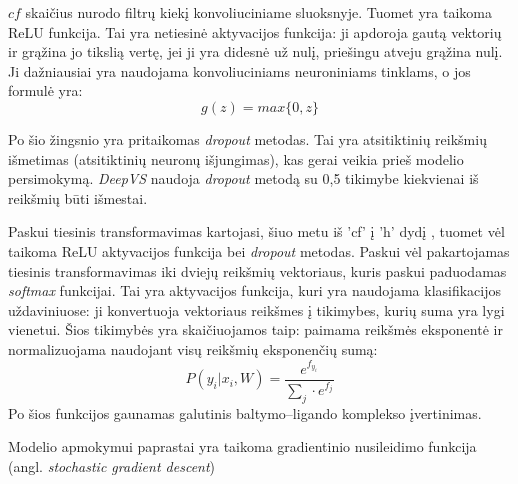 $cf$ skaičius nurodo filtrų kiekį konvoliuciniame sluoksnyje.  Tuomet yra taikoma ReLU funkcija. Tai yra netiesinė aktyvacijos funkcija: ji apdoroja gautą vektorių ir grąžina jo tikslią vertę, jei ji yra didesnė už nulį, priešingu atveju grąžina nulį. Ji dažniausiai yra naudojama konvoliuciniams neuroniniams tinklams, o jos formulė yra:
\begin{equation}
 g(z) = max\{0, z\}
\end{equation}

Po šio žingsnio yra pritaikomas \emph{dropout} metodas. Tai yra atsitiktinių reikšmių išmetimas (atsitiktinių neuronų išjungimas), kas gerai veikia prieš modelio persimokymą. \emph{DeepVS} naudoja \emph{dropout} metodą su 0,5 tikimybe kiekvienai iš reikšmių būti išmestai. 

Paskui tiesinis transformavimas kartojasi, šiuo metu iš 'cf' į 'h' dydį , tuomet vėl taikoma ReLU aktyvacijos funkcija bei \emph{dropout} metodas. Paskui vėl pakartojamas tiesinis transformavimas iki dviejų reikšmių vektoriaus, kuris paskui paduodamas \emph{softmax} funkcijai. Tai yra aktyvacijos funkcija, kuri yra naudojama klasifikacijos uždaviniuose: ji konvertuoja vektoriaus reikšmes į tikimybes, kurių suma yra lygi vienetui. Šios tikimybės yra skaičiuojamos taip: paimama reikšmės eksponentė ir normalizuojama naudojant visų reikšmių eksponenčių sumą:
\begin{equation}
P(y_{i} | x_{i}, W) = \frac{e^{f_{y_i}}}{\sum _j\cdot e^{f_j}}
\end{equation}
Po šios funkcijos gaunamas galutinis baltymo--ligando komplekso įvertinimas.

Modelio apmokymui paprastai yra taikoma gradientinio nusileidimo funkcija (angl. \textit{stochastic gradient descent})




